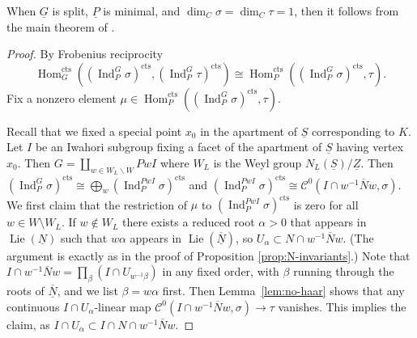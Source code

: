 \documentclass[a4paper]{amsart}
\numberwithin{equation}{section}
\theoremstyle{remark}
\theoremstyle{definition}
\DeclareMathOperator{\Ind}{Ind}
\DeclareMathOperator{\Hom}{Hom}
\DeclareMathOperator{\Lie}{Lie}
\newcommand{\alggrp}[1]{\underline{#1}}
\newcommand{\cts}{\mathrm{cts}}
\renewcommand{\o}[1]{\overline{#1}}
\begin{document}
When $\alggrp{G}$ is split, $\alggrp{P}$ is minimal, and $\dim_C \sigma = \dim_C \tau = 1$, then it follows from the main theorem of \cite{MR4346019}.

\begin{proof}
  By Frobenius reciprocity \[\Hom_G^\cts((\Ind_{P}^G\sigma)^{\cts},(\Ind_{P}^G\tau)^{\cts}) \cong \Hom^\cts_{P}((\Ind_{P}^G\sigma)^{\cts},\tau).\]
  Fix a nonzero element $\mu \in \Hom^\cts_{P}((\Ind_{P}^G\sigma)^{\cts},\tau)$.

  Recall that we fixed a special point $x_0$ in the apartment of $\alggrp S$ corresponding to $K$.
  Let $I$ be an Iwahori subgroup fixing a facet of the apartment of $\alggrp S$ having vertex $x_0$.
  Then $G = \coprod_{w \in W_{L}\backslash W} PwI$ where $W_{L}$ is the Weyl group $N_{\alggrp L}(\alggrp S)/\alggrp Z$.
  Then $(\Ind_{P}^G\sigma)^{\cts} \cong \bigoplus_{w} (\Ind_{P}^{P w I}\sigma)^{\cts}$
  and $(\Ind_{P}^{P w I}\sigma)^{\cts} \cong \mathcal C^0(I \cap w^{-1}\o Nw, \sigma)$.
  We first claim that the restriction of $\mu$ to $(\Ind_{P}^{P w I}\sigma)^{\cts}$ is zero for all $w \in W\setminus W_{L}$.
  If $w \notin W_{L}$ there exists a reduced root $\alpha > 0$ that appears in $\Lie(\alggrp{N})$ such that $w\alpha$ appears in $\Lie(\overline{\alggrp{N}})$, so $U_\alpha \subset N \cap w^{-1}\overline{N}w$.
  (The argument is exactly as in the proof of Proposition \ref{prop:N-invariants}.)
  Note that $I \cap w^{-1}\overline{N}w = \prod_{\beta} (I \cap U_{w^{-1}\beta})$ in any fixed order, with $\beta$ running through the roots of $\o{\alggrp N}$, and we list $\beta = w\alpha$ first.
  Then Lemma~\ref{lem:no-haar} shows that any continuous $I \cap U_\alpha$-linear map $\mathcal C^0(I \cap w^{-1}\overline{N}w,\sigma)\to\tau$ vanishes.
  This implies the claim, as $I \cap U_\alpha \subset I \cap N \cap w^{-1}\overline{N}w$.


\end{proof}
\end{document}
